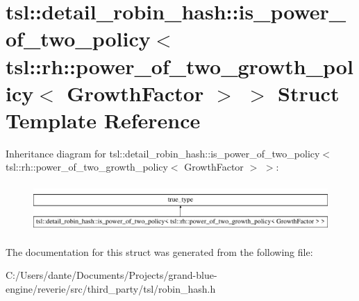 \hypertarget{structtsl_1_1detail__robin__hash_1_1is__power__of__two__policy_3_01tsl_1_1rh_1_1power__of__two__39448f1e68e6ca7632b43a703f652bfa}{}\section{tsl\+::detail\+\_\+robin\+\_\+hash\+::is\+\_\+power\+\_\+of\+\_\+two\+\_\+policy$<$ tsl\+::rh\+::power\+\_\+of\+\_\+two\+\_\+growth\+\_\+policy$<$ Growth\+Factor $>$ $>$ Struct Template Reference}
\label{structtsl_1_1detail__robin__hash_1_1is__power__of__two__policy_3_01tsl_1_1rh_1_1power__of__two__39448f1e68e6ca7632b43a703f652bfa}
Inheritance diagram for tsl\+::detail\+\_\+robin\+\_\+hash\+::is\+\_\+power\+\_\+of\+\_\+two\+\_\+policy$<$ tsl\+::rh\+::power\+\_\+of\+\_\+two\+\_\+growth\+\_\+policy$<$ Growth\+Factor $>$ $>$\+:\begin{figure}[H]
\begin{center}
\leavevmode
\includegraphics[height=1.848185cm]{structtsl_1_1detail__robin__hash_1_1is__power__of__two__policy_3_01tsl_1_1rh_1_1power__of__two__39448f1e68e6ca7632b43a703f652bfa}
\end{center}
\end{figure}


The documentation for this struct was generated from the following file\+:\begin{DoxyCompactItemize}
\item 
C\+:/\+Users/dante/\+Documents/\+Projects/grand-\/blue-\/engine/reverie/src/third\+\_\+party/tsl/robin\+\_\+hash.\+h\end{DoxyCompactItemize}

